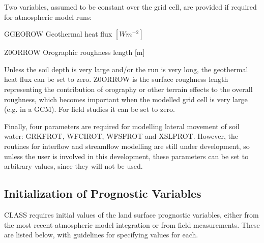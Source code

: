 Two variables, assumed to be constant over the grid cell, are provided if required for atmospheric model runs\+:


\begin{DoxyItemize}
\item G\+G\+E\+O\+R\+O\+W Geothermal heat flux $[W m^{-2} ]$
\item Z0\+O\+R\+R\+O\+W Orographic roughness length \mbox{[}m\mbox{]}
\end{DoxyItemize}

Unless the soil depth is very large and/or the run is very long, the geothermal heat flux can be set to zero. Z0\+O\+R\+R\+O\+W is the surface roughness length representing the contribution of orography or other terrain effects to the overall roughness, which becomes important when the modelled grid cell is very large (e.\+g. in a G\+C\+M). For field studies it can be set to zero.

Finally, four parameters are required for modelling lateral movement of soil water\+: G\+R\+K\+F\+R\+O\+T, W\+F\+C\+I\+R\+O\+T, W\+F\+S\+F\+R\+O\+T and X\+S\+L\+P\+R\+O\+T. However, the routines for interflow and streamflow modelling are still under development, so unless the user is involved in this development, these parameters can be set to arbitrary values, since they will not be used.\hypertarget{index_initProgVar}{}\subsection{Initialization of Prognostic Variables}\label{index_initProgVar}
C\+L\+A\+S\+S requires initial values of the land surface prognostic variables, either from the most recent atmospheric model integration or from field measurements. These are listed below, with guidelines for specifying values for each.



